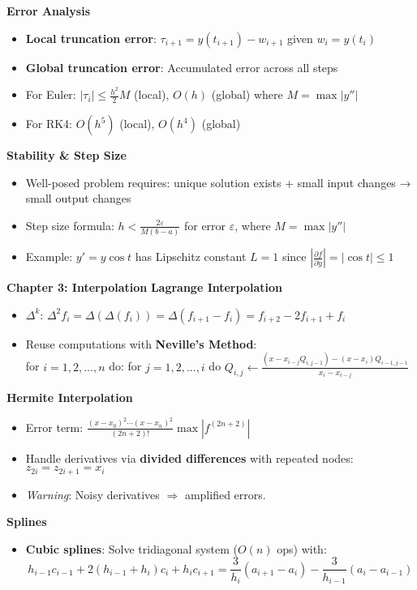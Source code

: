 \documentclass{article}
\begin{document}
\begin{minipage}[t]{0.49\textwidth}
    \textbf{Error Analysis}
    \begin{itemize}
    \item \textbf{Local truncation error}: $\tau_{i+1} = y(t_{i+1}) - w_{i+1}$ given $w_i = y(t_i)$
    \item \textbf{Global truncation error}: Accumulated error across all steps
    \item For Euler: $|\tau_i| \leq \frac{h^2}{2}M$ (local), $O(h)$ (global) where $M = \max|y''|$
    \item For RK4: $O(h^5)$ (local), $O(h^4)$ (global)
    \end{itemize}
    
    \textbf{Stability \& Step Size}
    \begin{itemize}
    \item Well-posed problem requires: unique solution exists + small input changes → small output changes
    \item Step size formula: $h < \frac{2\varepsilon}{M(b-a)}$ for error $\varepsilon$, where $M = \max|y''|$
    \item Example: $y'=y\cos t$ has Lipschitz constant $L=1$ since $|\frac{\partial f}{\partial y}| = |\cos t| \leq 1$
    \end{itemize}
\textbf{Chapter 3: Interpolation}
\textbf{Lagrange Interpolation}
\begin{itemize}
    \item \textbf{$\Delta^k$}: $\Delta^2f_i=\Delta(\Delta(f_i))=\Delta(f_{i+1}-f_i)=f_{i+2}-2f_{i+1}+f_i$
    \item Reuse computations with \textbf{Neville's Method}:\\ for $i=1,2,...,n$ do: for $j=1,2,...,i$ do $Q_{i,j} \leftarrow \frac{(x-x_{i-j}Q_{i,j-1})-(x-x_i)Q_{i-1,j-1}}{x_i-x_{i-j}}$
\end{itemize}

\textbf{Hermite Interpolation}
\begin{itemize}
    \item Error term: \( \frac{(x-x_0)^2\cdots(x-x_n)^2}{(2n+2)!}\max|f^{(2n+2)}| \)
    \item Handle derivatives via \textbf{divided differences} with repeated nodes: \( z_{2i}=z_{2i+1}=x_i \)
    \item \textit{Warning}: Noisy derivatives \(\Rightarrow\) amplified errors.
\end{itemize}

\textbf{Splines}
\begin{itemize}
    \item \textbf{Cubic splines}: Solve tridiagonal system (\(O(n)\) ops) with:
        \[ h_{i-1}c_{i-1} + 2(h_{i-1}+h_i)c_i + h_ic_{i+1} = \frac{3}{h_i}(a_{i+1}-a_i) - \frac{3}{h_{i-1}}(a_i-a_{i-1}) \]
\end{itemize}


\end{minipage}
\end{document}
